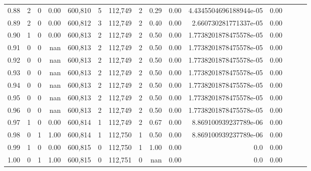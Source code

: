 \begin{tabular}{rrrrrrrrrrrrrrr}
0.88 &        2 &       0 &  0.00 &  600,810 &        5 &  112,749 &        2 &  0.29 &  0.00 &  4.4345504696188944e-05 &      0.00 \\
0.89 &        2 &       0 &  0.00 &  600,812 &        3 &  112,749 &        2 &  0.40 &  0.00 &   2.660730281771337e-05 &      0.00 \\
0.90 &        1 &       0 &  0.00 &  600,813 &        2 &  112,749 &        2 &  0.50 &  0.00 &  1.7738201878475578e-05 &      0.00 \\
0.91 &        0 &       0 &   nan &  600,813 &        2 &  112,749 &        2 &  0.50 &  0.00 &  1.7738201878475578e-05 &      0.00 \\
0.92 &        0 &       0 &   nan &  600,813 &        2 &  112,749 &        2 &  0.50 &  0.00 &  1.7738201878475578e-05 &      0.00 \\
0.93 &        0 &       0 &   nan &  600,813 &        2 &  112,749 &        2 &  0.50 &  0.00 &  1.7738201878475578e-05 &      0.00 \\
0.94 &        0 &       0 &   nan &  600,813 &        2 &  112,749 &        2 &  0.50 &  0.00 &  1.7738201878475578e-05 &      0.00 \\
0.95 &        0 &       0 &   nan &  600,813 &        2 &  112,749 &        2 &  0.50 &  0.00 &  1.7738201878475578e-05 &      0.00 \\
0.96 &        0 &       0 &   nan &  600,813 &        2 &  112,749 &        2 &  0.50 &  0.00 &  1.7738201878475578e-05 &      0.00 \\
0.97 &        1 &       0 &  0.00 &  600,814 &        1 &  112,749 &        2 &  0.67 &  0.00 &   8.869100939237789e-06 &      0.00 \\
0.98 &        0 &       1 &  1.00 &  600,814 &        1 &  112,750 &        1 &  0.50 &  0.00 &   8.869100939237789e-06 &      0.00 \\
0.99 &        1 &       0 &  0.00 &  600,815 &        0 &  112,750 &        1 &  1.00 &  0.00 &                     0.0 &      0.00 \\
1.00 &        0 &       1 &  1.00 &  600,815 &        0 &  112,751 &        0 &   nan &  0.00 &                     0.0 &      0.00 \\
\bottomrule
\end{tabular}
